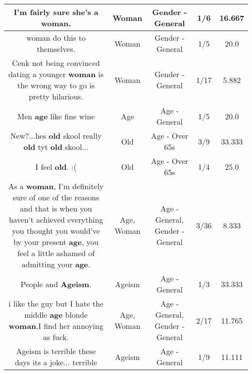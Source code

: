 \documentclass[11pt]{article}
\newlength\mylength
\begin{document}
\begin{center}
\begin{longtable}{|C{.65\mylength}|C{.30\mylength}|C{.12\mylength}|C{.12\mylength}|C{.12\mylength}|}
  \small I'm fairly sure she's a \textbf{woman}.\normalsize   & Woman & Gender - General & 1/6 & 16.667 \\  \hline
  \small woman do this to themselves.\normalsize   & Woman & Gender - General & 1/5 & 20.0 \\  \hline
  \small Cenk not being convinced dating a younger \textbf{woman} is the wrong way to go is pretty hilarious.\normalsize   & Woman & Gender - General & 1/17 & 5.882 \\  \hline
  \small Men \textbf{age} like fine wine\normalsize   & Age & Age - General & 1/5 & 20.0 \\  \hline
  \small New?...hes \textbf{old} skool really \textbf{old} tyt \textbf{old} skool...\normalsize   & Old & Age - Over 65s & 3/9 & 33.333 \\  \hline
  \small I feel \textbf{old}. :(\normalsize   & Old & Age - Over 65s & 1/4 & 25.0 \\  \hline
  \small As a \textbf{woman}, I'm definitely sure of one of the reasons and that is when you haven't achieved everything you thought you would've by your present \textbf{age}, you feel a little ashamed of admitting your \textbf{age}.\normalsize   & Age, Woman & Age - General, Gender - General & 3/36 & 8.333 \\  \hline
  \small People and \textbf{Ageism}.\normalsize   & Ageism & Age - General & 1/3 & 33.333 \\  \hline
  \small i like the guy but I hate the middle \textbf{age} blonde \textbf{woman},I find her annoying as fuck.\normalsize   & Age, Woman & Age - General, Gender - General & 2/17 & 11.765 \\  \hline
  \small Ageism is terrible these days its a joke... terrible\normalsize   & Ageism & Age - General & 1/9 & 11.111 \\  \hline

\end{longtable}
\end{center}
\end{document}
